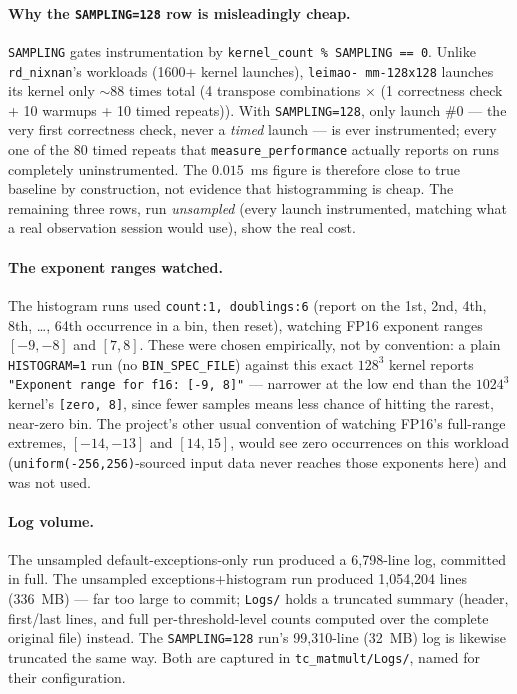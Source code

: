 \documentclass[11pt]{article}
\begin{document}
\paragraph{Why the \texttt{SAMPLING=128} row is misleadingly cheap.} \texttt{SAMPLING}
gates instrumentation by \texttt{kernel\_count \% SAMPLING == 0}. Unlike
\texttt{rd\_nixnan}'s workloads (1600+ kernel launches), \texttt{leimao-\allowbreak
mm-128x128} launches its kernel only $\sim\!88$ times total (4 transpose combinations $\times$ (1
correctness check + 10 warmups + 10 timed repeats)). With \texttt{SAMPLING=128}, only
launch \#0 --- the very first correctness check, never a \emph{timed} launch --- is ever
instrumented; every one of the 80 timed repeats that \texttt{measure\_performance}
actually reports on runs completely uninstrumented. The $0.015$~ms figure is therefore
close to true baseline by construction, not evidence that histogramming is cheap. The
remaining three rows, run \emph{unsampled} (every launch instrumented, matching what a
real observation session would use), show the real cost.

\paragraph{The exponent ranges watched.} The histogram runs used \texttt{count:1,
doublings:6} (report on the 1st, 2nd, 4th, 8th, \ldots, 64th occurrence in a bin, then
reset), watching FP16 exponent ranges $[-9,-8]$ and $[7,8]$. These were chosen
empirically, not by convention: a plain \texttt{HISTOGRAM=1} run (no
\texttt{BIN\_SPEC\_FILE}) against this exact $128^3$ kernel reports \texttt{"Exponent
range for f16: [-9, 8]"} --- narrower at the low end than the $1024^3$ kernel's
\texttt{[zero, 8]}, since fewer samples means less chance of hitting the rarest,
near-zero bin. The project's other usual convention of watching FP16's full-range
extremes, $[-14,-13]$ and $[14,15]$, would see zero occurrences on this workload
(\texttt{uniform(-256,256)}-sourced input data never reaches those exponents here) and
was not used.

\paragraph{Log volume.} The unsampled default-exceptions-only run produced a 6{,}798-line
log, committed in full. The unsampled exceptions+histogram run produced
1{,}054{,}204 lines (336~MB) --- far too large to commit; \texttt{Logs/} holds a
truncated summary (header, first/last lines, and full per-threshold-level counts computed
over the complete original file) instead. The \texttt{SAMPLING=128} run's 99{,}310-line
(32~MB) log is likewise truncated the same way. Both are captured in
\texttt{tc\_matmult/Logs/}, named for their configuration.
\end{document}
